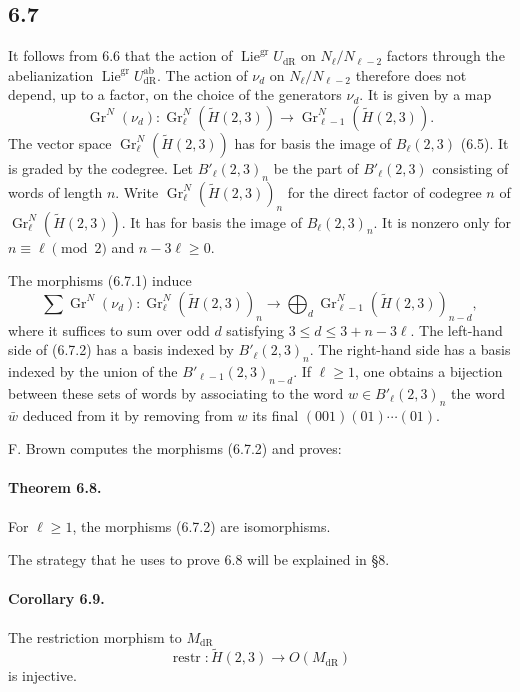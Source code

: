 \documentclass[11pt]{article}
\newcommand{\Lie}{\operatorname{Lie}}
\newcommand{\Gr}{\operatorname{Gr}}
\newcommand{\dR}{\mathrm{dR}}
\newcommand{\ab}{\mathrm{ab}}
\newcommand{\restr}{\operatorname{restr}}
\begin{document}
\subsection*{6.7}
It follows from 6.6 that the action of $\Lie^{\mathrm{gr}}U_{\dR}$ on $N_\ell/N_{\ell-2}$ factors through the abelianization $\Lie^{\mathrm{gr}}U^{\ab}_{\dR}$.
The action of $\nu_d$ on $N_\ell/N_{\ell-2}$ therefore does not depend, up to a factor, on the choice of the generators $\nu_d$.
It is given by a map
\begin{equation}
 \Gr^N(\nu_d):\Gr^N_\ell(\widetilde H(2,3))\longrightarrow\Gr^N_{\ell-1}(\widetilde H(2,3)).
\tag{6.7.1}
\end{equation}
The vector space $\Gr^N_\ell(\widetilde H(2,3))$ has for basis the image of $B_\ell(2,3)$ (6.5).
It is graded by the codegree.
Let $B'_\ell(2,3)_n$ be the part of $B'_\ell(2,3)$ consisting of words of length $n$.
Write $\Gr^N_\ell(\widetilde H(2,3))_n$ for the direct factor of codegree $n$ of $\Gr^N_\ell(\widetilde H(2,3))$.
It has for basis the image of $B_\ell(2,3)_n$.
It is nonzero only for $n\equiv\ell\pmod2$ and $n-3\ell\geq0$.

The morphisms (6.7.1) induce
\begin{equation}
 \sum \Gr^N(\nu_d):\Gr^N_\ell(\widetilde H(2,3))_n
 \longrightarrow \bigoplus_d \Gr^N_{\ell-1}(\widetilde H(2,3))_{n-d},
\tag{6.7.2}
\end{equation}
where it suffices to sum over odd $d$ satisfying $3\leq d\leq3+n-3\ell$.
The left-hand side of (6.7.2) has a basis indexed by $B'_\ell(2,3)_n$.
The right-hand side has a basis indexed by the union of the $B'_{\ell-1}(2,3)_{n-d}$.
If $\ell\geq1$, one obtains a bijection between these sets of words by associating to the word $w\in B'_\ell(2,3)_n$ the word $\bar w$ deduced from it by removing from $w$ its final $(001)(01)\cdots(01)$.

F. Brown computes the morphisms (6.7.2) and proves:

\paragraph{Theorem 6.8.}
For $\ell\geq1$, the morphisms (6.7.2) are isomorphisms.

The strategy that he uses to prove 6.8 will be explained in \S8.

\paragraph{Corollary 6.9.}
The restriction morphism to $M_{\dR}$
\begin{equation}
 \restr:\widetilde H(2,3)\longrightarrow O(M_{\dR})
\tag{6.9.1}
\end{equation}
is injective.
\end{document}
